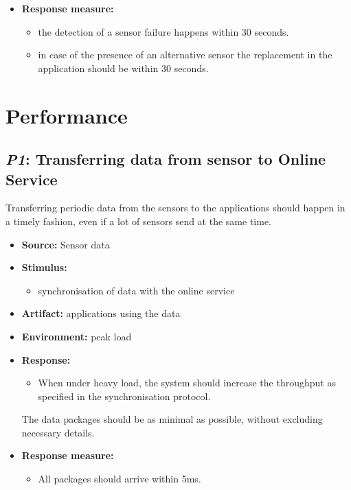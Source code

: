 \begin{itemize}
    \item \textbf{Response measure:}
        \begin{itemize}
            \item the detection of a sensor failure happens within 30 seconds.
            \item in case of the presence of an alternative sensor the replacement in the application should be within 30 seconds.
        \end{itemize}
\end{itemize}
\section{Performance}
\subsection{\emph{P1}: Transferring data from sensor to Online Service}
Transferring periodic data from the sensors to the applications should happen in a timely fashion, even if a lot of sensors send at the same time.

\begin{itemize}
    \item \textbf{Source:} Sensor data
    \item \textbf{Stimulus:}
        \begin{itemize}
            \item synchronisation of data with the online service
        \end{itemize}

    \item \textbf{Artifact:} applications using the data
    \item \textbf{Environment:} peak load
    \item \textbf{Response:}
        \begin{itemize}
            \item When under heavy load, the system should increase the throughput as specified in the synchronisation protocol.
        \end{itemize} The data packages should be as minimal as possible, without excluding necessary details.
    \item \textbf{Response measure:}
        \begin{itemize}
            \item All packages should arrive within 5ms.
        \end{itemize}
\end{itemize}

